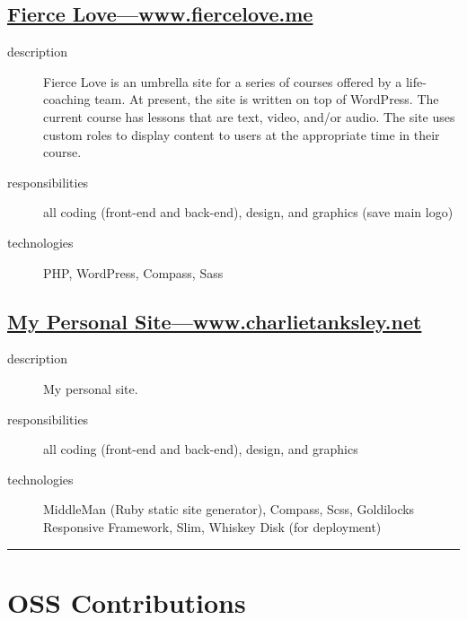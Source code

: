 \documentclass{article}
\begin{document}
\begin{multicols}{2}

\subsection{\href{http://www.fiercelove.me}
  {Fierce Love---www.fiercelove.me}}
\label{sub:Fierce Love}

\begin{description}
  \item[description] Fierce Love is an umbrella site for a series of 
    courses offered by a life-coaching team.  At present, the site is 
    written on top of WordPress.  The current course has lessons that 
    are text, video, and/or audio.  The site uses custom roles to 
    display content to users at the appropriate time in their course.
  \item[responsibilities] all coding (front-end and back-end), design, 
    and graphics (save main logo)
  \item[technologies] PHP, WordPress, Compass, Sass
\end{description}


\subsection{\href{http://www.charlietanksley.net}
  {My Personal Site---www.charlietanksley.net}}
\label{sub:My Personal Site}

\begin{description}
  \item[description] My personal site.  \item[responsibilities] all 
    coding (front-end and back-end), design, and graphics 
  \item[technologies] MiddleMan (Ruby static site generator), Compass, 
    Scss, Goldilocks Responsive Framework, Slim, Whiskey Disk (for 
    deployment)
\end{description}

\end{multicols}

\hrule
\section{OSS Contributions} %
\label{sec:OSS Contributions}
\end{document}
